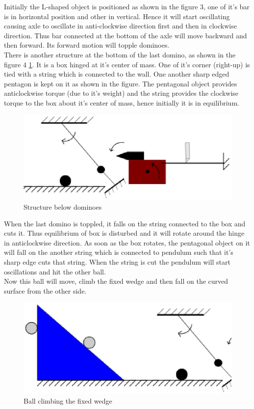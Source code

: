 \documentclass[a4paper,11pt]{article}
\begin{document}
{\indent Initially the L-shaped object is positioned as shown in the figure 3, one of it's bar is in horizontal position and other in vertical. Hence it will start oscillating causing axle to oscillate in anti-clockwise direction first and then in clockwise direction. Thus bar connected at the bottom of the axle will move backward and then forward. Its forward motion will topple dominoes. \\

\indent There is another structure at the bottom of the last domino, as shown in the figure 4 \ref{fig:image1}.  It is a box hinged at it's center of mass. One of it's corner (right-up) is tied with a string which is connected to the wall. One another sharp edged pentagon is kept on it as shown in the figure. The pentagonal object provides anticlockwise torque (due to it's weight) and the string provides the clockwise torque to the box about it's center of mass, hence initially it is in equilibrium. 
\begin{figure}[h]
    \centering
    \label{fig:image1}
    \includegraphics[scale=0.6]{images/image1}
    \caption{Structure below dominoes}
\end{figure}

\indent When the last domino is toppled, it falls on the string connected to the box and cuts it. Thus equilibrium of box is disturbed and it will rotate around the hinge in anticlockwise direction. As soon as the box rotates, the pentagonal object on it will fall on the another string which is connected to pendulum such that it's sharp edge cuts that string. When the string is cut the pendulum will start oscillations and hit the other ball. \\

\newpage
\indent Now this ball will move, climb the fixed wedge and then fall on the curved surface from the other side.
\begin{figure}[h]
    \centering
    \label{fig:image2}
    \includegraphics[scale=0.4]{images/image2}
    \caption{Ball climbing the fixed wedge}
\end{figure}


}
\end{document}
